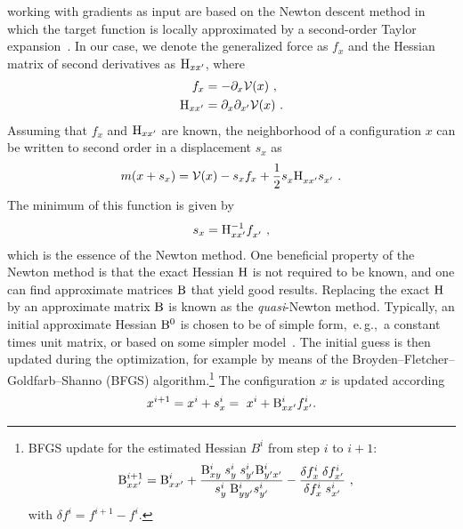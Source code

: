  working with gradients as input are based on the Newton descent method in which the target function is locally approximated by a second-order Taylor expansion~\cite{nocedal2006}. In our case, we denote the generalized force as $f_x$ and the Hessian matrix of second derivatives as ${\rm H}_{xx'}$, where
\begin{align}
f_x 
&= - \partial_x \mathcal V (x)~,
\label{eq:opt.f} \\
{\rm H}_{xx'} 
&= \partial_x \partial_{x'} \mathcal{V} (x)~.
\label{eq:opt.H}
\end{align}
Assuming that $f_x$ and ${\rm H}_{xx'}$ are known, the neighborhood of a configuration $x$ can be written to second order in a displacement $s_x$ as
\begin{align}
m(x + s_x) 
= \mathcal V (x) - s_x f_x + \halb \fD s_x \fD {\rm H}_{xx'} \fP s_{x'}~.
\label{eq:opt.m}
\end{align}
The minimum of this function is given by
\begin{align}
s_x = {\rm H}_{xx'}^{-1} \fD f_{x'}~,
\end{align}
which is the essence of the Newton method. One beneficial property of the Newton method is that the exact Hessian $\rm H$ is not required to be known, and one can find approximate matrices $\rm B$ that yield good results. Replacing the exact $\rm H$ by an approximate matrix $\rm B$ is known as the \emph{quasi}-Newton method.
Typically, an initial approximate Hessian $\rm B^0$ is chosen to be of simple form,~e.\,g.,~a constant times unit matrix, or based on some simpler model~\cite{lindh1995}. The initial guess is then updated during the optimization, for example by means of the  Broyden–Fletcher–Goldfarb–Shanno (BFGS) algorithm.\footnote{BFGS update for the estimated Hessian $B^i$ from step $i$ to $i+1$:
	\begin{align*}
	{\rm B}^{i + 1}_{xx'}
	= {\rm B}^i_{xx'} 
	& + \frac{{\rm B}^i_{x\fP{y}} s^i_{\fP{y}} s^i_{y'} {\rm B}^i_{y'x'} }{s^i_{\fP y} {\rm B}^i_{yy'} s^i_{y'}}
	- \frac{\delta f^i_{\fP x} \delta f^i_{x'}}{\delta f^i_{\fP x} s^i_{x'}}~,
	\end{align*}
	with $\delta f^i = f^{i+1} - f^i$.
}
The configuration $x$ is updated according
\begin{align}
x^{i+1} = x^i + s_x^i = ~x^i + {\rm B}^i_{xx'} f^i_{x'}.
\end{align}

